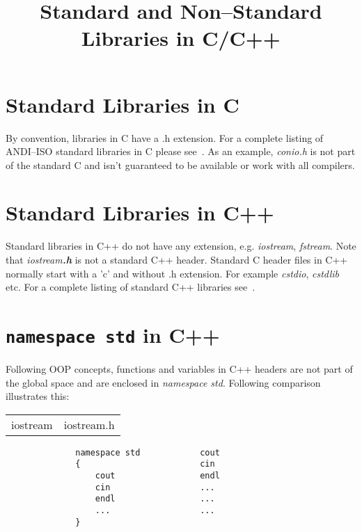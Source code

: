 \documentclass[12pt,a4paper]{article}
\begin{document}
\title{Standard and Non--Standard Libraries in C/C++}
\maketitle

\section{Standard Libraries in C}

By convention, libraries in C have a .h extension. For a complete listing of ANDI--ISO standard libraries in C please see~\cite{wikc}. As an example, \emph{conio.h} is not part of the standard C and isn't guaranteed to be available or work with all compilers.

\section{Standard Libraries in C++}

Standard libraries in C++ do not have any extension, e.g. \emph{iostream}, \emph{fstream}. Note that \emph{iostream\textbf{.h}} is not a standard C++ header. Standard C header files in C++ normally start with a 'c' and without .h extension. For example \emph{cstdio}, \emph{cstdlib} etc. For a complete listing of standard C++ libraries see~\cite{wikcpp}.

\section{\texttt{namespace std} in C++}

Following OOP concepts, functions and variables in C++ headers are not part of the global space and are enclosed in \emph{namespace std}. Following comparison illustrates this:

\begin{center}
\begin{tabular}{p{2in}p{2in}}
iostream & iostream.h\\
\end{tabular}
\begin{verbatim}
              namespace std            cout
              {                        cin
                  cout                 endl
                  cin                  ...
                  endl                 ...
                  ...                  ...
              }
\end{verbatim}
\end{center}
\end{document}
